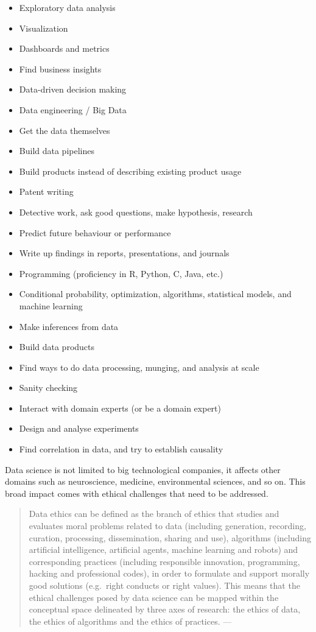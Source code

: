 \documentclass[
]{book}
\providecommand{\tightlist}{%
  \setlength{\itemsep}{0pt}\setlength{\parskip}{0pt}}
\begin{document}
\begin{itemize}
\tightlist
\item
  Exploratory data analysis
\item
  Visualization
\item
  Dashboards and metrics
\item
  Find business insights
\item
  Data-driven decision making
\item
  Data engineering / Big Data
\item
  Get the data themselves
\item
  Build data pipelines
\item
  Build products instead of describing existing product usage
\item
  Patent writing
\item
  Detective work, ask good questions, make hypothesis, research
\item
  Predict future behaviour or performance
\item
  Write up findings in reports, presentations, and journals
\item
  Programming (proficiency in R, Python, C, Java, etc.)
\item
  Conditional probability, optimization, algorithms, statistical models, and machine learning
\item
  Make inferences from data
\item
  Build data products
\item
  Find ways to do data processing, munging, and analysis at scale
\item
  Sanity checking
\item
  Interact with domain experts (or be a domain expert)
\item
  Design and analyse experiments
\item
  Find correlation in data, and try to establish causality
\end{itemize}

Data science is not limited to big technological companies, it affects other domains such as neuroscience, medicine, environmental sciences, and so on. This broad impact comes with ethical challenges that need to be addressed.

\begin{quote}
Data ethics can be defined as the branch of ethics that studies and evaluates moral problems related to data (including generation, recording, curation, processing, dissemination, sharing and use), algorithms (including artificial intelligence, artificial agents, machine learning and robots) and corresponding practices (including responsible innovation, programming, hacking and professional codes), in order to formulate and support morally good solutions (e.g.~right conducts or right values). This means that the ethical challenges posed by data science can be mapped within the conceptual space delineated by three axes of research: the ethics of data, the ethics of algorithms and the ethics of practices. --- \citep{luciano2016data}
\end{quote}
\end{document}

